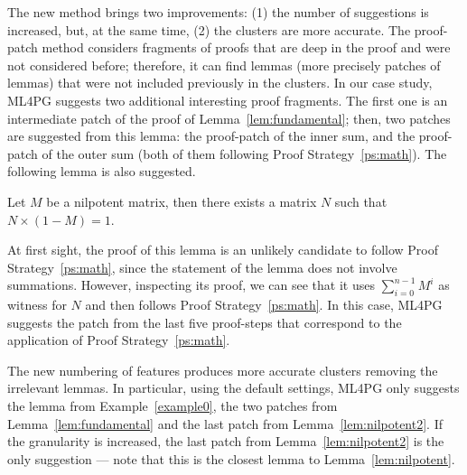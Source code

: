  
The new method brings two improvements:
(1) the number of suggestions is increased, but, at the same time, (2) 
the clusters are more accurate. The proof-patch method considers fragments of proofs that are deep in the proof and were not considered before; therefore, it can find lemmas (more precisely patches of lemmas) that were not
included previously in the clusters. In our case study, ML4PG suggests two additional interesting proof fragments. The first one is an intermediate patch of the proof of 
Lemma~\ref{lem:fundamental}; then, two patches are suggested from this 
lemma: the proof-patch of the inner sum, and the proof-patch of the outer sum (both of them following Proof Strategy~\ref{ps:math}). The following lemma is also 
suggested.

\begin{lemma}\label{lem:nilpotent2}
Let $M$ be a nilpotent matrix, then there exists a matrix $N$ such that $N \times (1-M)=1$. 
\end{lemma}

At first sight, the proof of this lemma is an unlikely candidate to follow  Proof Strategy~\ref{ps:math}, since the statement of the lemma
does not involve summations. However, inspecting its proof, we can see that it uses $\sum_{i=0}^{n-1} M^i$ as witness for $N$ and 
then follows Proof Strategy~\ref{ps:math}. In this case, ML4PG suggests the patch from the last five proof-steps that correspond to 
the application of Proof Strategy~\ref{ps:math}. 


The new numbering of features produces more accurate clusters removing the irrelevant lemmas. In particular, using the default settings, 
ML4PG only suggests the lemma from Example~\ref{example0}, the two patches from Lemma~\ref{lem:fundamental} and the last patch from 
Lemma~\ref{lem:nilpotent2}. If the granularity is increased, the last patch from 
Lemma~\ref{lem:nilpotent2} is the only suggestion --- note that this is the closest lemma to Lemma~\ref{lem:nilpotent}. 





















